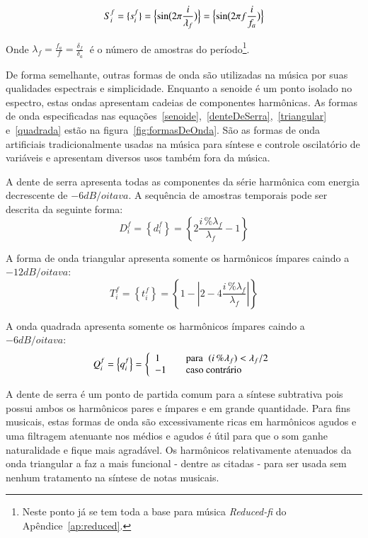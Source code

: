 \begin{equation}\label{senoide}
     S^f_i=\{ s^f_i \}=\Bigl\{ \sin\bigl(2\pi \frac{i}{\lambda_f} \bigr)  \Bigr\} = \Bigl\{ \sin\bigl(2\pi f \frac{i}{f_a}\bigr)  \Bigr\} 
\end{equation}

Onde $\lambda_f=\frac{f_a}{f}=\frac{\delta_f}{\delta_a} \;$ é o número de amostras do período\footnote{Neste ponto já se tem toda a base para música \emph{Reduced-fi} do Apêndice~\ref{ap:reduced}.}.

De forma semelhante, outras formas de onda são utilizadas na música por suas qualidades
espectrais e simplicidade. Enquanto a senoide é um ponto isolado no espectro, estas 
ondas apresentam cadeias de componentes harmônicas.
As formas de onda especificadas nas equações~\ref{senoide},~\ref{denteDeSerra},~\ref{triangular} e~\ref{quadrada} estão na figura~\ref{fig:formasDeOnda}.
São as formas de onda artificiais tradicionalmente usadas na música para síntese e controle oscilatório de variáveis e apresentam diversos usos também fora da música.\cite{Openheim}

A dente de serra apresenta todas as componentes da série
harmônica com energia decrescente de $-6dB/oitava$. A sequência de amostras temporais pode ser descrita da seguinte forma:
\begin{equation}\label{denteDeSerra}
     D^f_i=\left\{ d^f_i \right\}=\left\{ 2\frac{i\,\%\lambda_f}{\lambda_f} -1 \right\}
\end{equation}

A forma de onda triangular apresenta somente os harmônicos ímpares caindo a $-12dB/oitava$:
\begin{equation}\label{triangular}
     T^f_i=\left\{ t^f_i \right\}=\left\{1- \left| 2 - 4\frac{i\,\%\lambda_f}{\lambda_f} \right| \right\}
\end{equation}

A onda quadrada apresenta somente os harmônicos ímpares caindo a $-6dB/oitava$:
\begin{equation}\label{quadrada}
     Q^f_i=\left\{ q^f_i \right\}= \left\{
         \begin{array}{l l}
              1 & \quad \text{para} \; \; (i\,\%\lambda_f)   <  \lambda_f /2  \\
              -1 & \quad \text{caso contrário}\\
         \end{array} \right.
\end{equation}

A dente de serra é um ponto de partida comum para a síntese subtrativa pois possui
ambos os harmônicos pares e ímpares e em grande quantidade. Para fins musicais, estas formas de onda são excessivamente ricas em harmônicos agudos e uma filtragem atenuante nos médios e agudos é útil para que o som ganhe naturalidade e fique mais agradável.
Os harmônicos relativamente atenuados da onda triangular
a faz a mais funcional - dentre as citadas - para ser usada sem nenhum tratamento na síntese de notas musicais.

